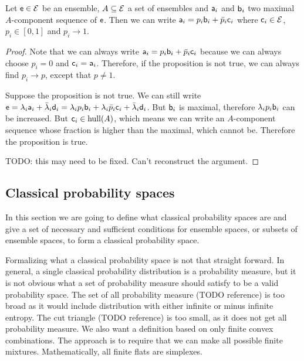 \begin{prop}
	Let $\ens \in \Ens$ be an ensemble, $A \subseteq \Ens$ a set of ensembles and $\ens[a]_i$ and $\ens[b]_i$ two maximal $A$-component sequence of $\ens$. Then we can write $\ens[a]_i = p_i \ens[b]_i + \bar{p}_i \ens[c]_i$ where $\ens[c]_i \in \Ens$, $p_i \in [0,1]$ and $p_i \to 1$.
\end{prop}

\begin{proof}
	Note that we can always write $\ens[a]_i = p_i \ens[b]_i + \bar{p}_i \ens[c]_i$ because we can always choose $p_i = 0$ and $\ens[c]_i = \ens[a]_i$. Therefore, if the proposition is not true, we can always find $p_i \to p$, except that $p \neq 1$.
	
	Suppose the proposition is not true. We can still write $\ens = \lambda_i \ens[a]_i + \bar{\lambda}_i \ens[d]_i = \lambda_i p_i \ens[b]_i + \lambda_i \bar{p}_i \ens[c]_i + \bar{\lambda}_i \ens[d]_i$. But $\ens[b]_i$ is maximal, therefore $\lambda_i p_i \ens[b]_i$ can be increased. But $\ens[c]_i \in \hull(A)$, which means we can write an $A$-component sequence whose fraction is higher than the maximal, which cannot be. Therefore the proposition is true.
	
	TODO: this may need to be fixed. Can't reconstruct the argument.
\end{proof}

\subsection{Classical probability spaces}

In this section we are going to define what classical probability spaces are and give a set of necessary and sufficient conditions for ensemble spaces, or subsets of ensemble spaces, to form a classical probability space.

Formalizing what a classical probability space is not that straight forward. In general, a single classical probability distribution is a probability measure, but it is not obvious what a set of probability measure should satisfy to be a valid probability space. The set of all probability measure (TODO reference) is too broad as it would include distribution with either infinite or minus infinite entropy. The cut triangle (TODO reference) is too small, as it does not get all probability measure. We also want a definition based on only finite convex combinations. The approach is to require that we can make all possible finite mixtures. Mathematically, all finite flats are simplexes.

